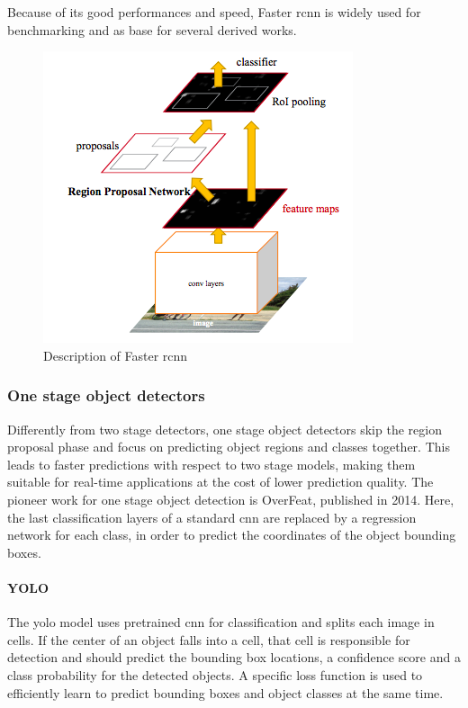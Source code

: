 \documentclass[%
    corpo=12pt,
    twoside,
    stile=classica,   
    tipotesi=magistrale,
    evenboxes,
    english,
	numerazioneromana,
]{toptesi}
\begin{document}
Because of its good performances and speed, Faster \gls{rcnn} is widely used for benchmarking and as base for several derived works.

\begin{figure}[ht]
	\centering
	\includegraphics[width=.5\linewidth]{imgs/fasterrcnn.png}
	\caption{Description of Faster \gls{rcnn}\cite{ren2016faster}}
	\label{fig:fasterrcnn}
\end{figure}

\subsubsection{One stage object detectors}
Differently from two stage detectors, one stage object detectors skip the region proposal phase and focus on predicting object regions and classes together. This leads to faster predictions with respect to two stage models, making them suitable for real-time applications at the cost of lower prediction quality. The pioneer work for one stage object detection is OverFeat\cite{sermanet2014overfeat}, published in 2014. Here, the last classification layers of a standard \gls{cnn} are replaced by a regression network for each class, in order to predict the coordinates of the object bounding boxes.

\paragraph{YOLO}\label{sec:yolo}
The \gls{yolo} model\cite{redmon2016look} uses pretrained \gls{cnn} for classification and splits each image in cells. If the center of an object falls into a cell, that cell is responsible for detection and should predict the bounding box locations, a confidence score and a class probability for the detected objects. A specific loss function is used to efficiently learn to predict bounding boxes and object classes at the same time.
\end{document}
